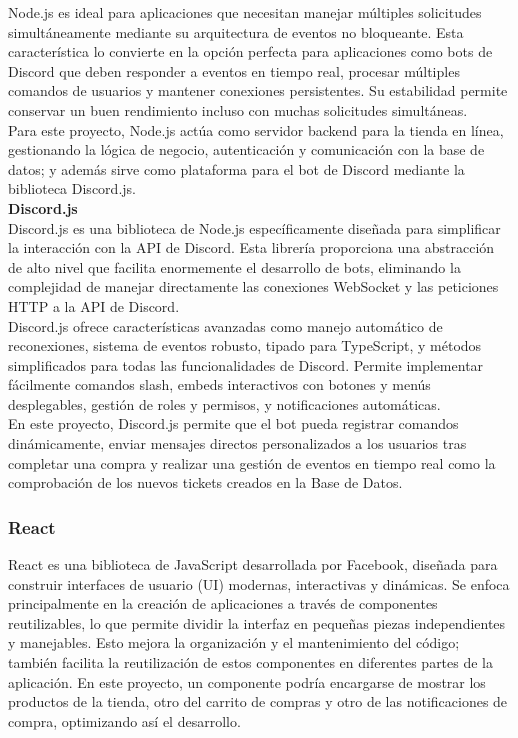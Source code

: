 \documentclass[a4paper,12pt]{article}
\begin{document}
Node.js es ideal para aplicaciones que necesitan manejar múltiples solicitudes simultáneamente mediante su arquitectura de eventos no bloqueante. Esta característica lo convierte en la opción perfecta para aplicaciones como bots de Discord que deben responder a eventos en tiempo real, procesar múltiples comandos de usuarios y mantener conexiones persistentes. Su estabilidad permite conservar un buen rendimiento incluso con muchas solicitudes simultáneas.\\

Para este proyecto, Node.js actúa como servidor backend para la tienda en línea, gestionando la lógica de negocio, autenticación y comunicación con la base de datos; y además sirve como plataforma para el bot de Discord mediante la biblioteca Discord.js.\\

\textbf{Discord.js}\\

Discord.js es una biblioteca de Node.js específicamente diseñada para simplificar la interacción con la API de Discord. Esta librería proporciona una abstracción de alto nivel que facilita enormemente el desarrollo de bots, eliminando la complejidad de manejar directamente las conexiones WebSocket y las peticiones HTTP a la API de Discord.\\

Discord.js ofrece características avanzadas como manejo automático de reconexiones, sistema de eventos robusto, tipado para TypeScript, y métodos simplificados para todas las funcionalidades de Discord. Permite implementar fácilmente comandos slash, embeds interactivos con botones y menús desplegables, gestión de roles y permisos, y notificaciones automáticas.\\

En este proyecto, Discord.js permite que el bot pueda registrar comandos dinámicamente, enviar mensajes directos personalizados a los usuarios tras completar una compra y realizar una gestión de eventos en tiempo real como la comprobación de los nuevos tickets creados en la Base de Datos.\\

\subsubsection{React}

React es una biblioteca de JavaScript desarrollada por Facebook, diseñada para construir interfaces de usuario (UI) modernas, interactivas y dinámicas. Se enfoca principalmente en la creación de aplicaciones a través de componentes reutilizables, lo que permite dividir la interfaz en pequeñas piezas independientes y manejables. Esto mejora la organización y el mantenimiento del código; también facilita la reutilización de estos componentes en diferentes partes de la aplicación. En este proyecto, un componente podría encargarse de mostrar los productos de la tienda, otro del carrito de compras y otro de las notificaciones de compra, optimizando así el desarrollo.\\
\end{document}
